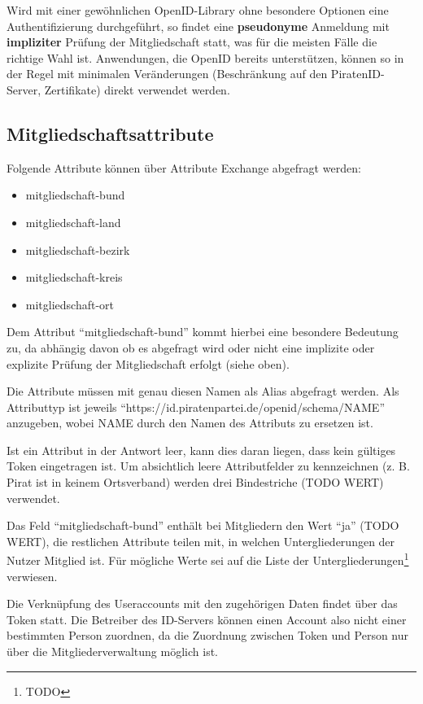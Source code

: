 \documentclass[parskip=half]{scrartcl}
\begin{document}
Wird mit einer gewöhnlichen OpenID-Library ohne besondere Optionen eine Authentifizierung durchgeführt, 
so findet eine \textbf{pseudonyme} Anmeldung mit \textbf{impliziter} Prüfung der Mitgliedschaft statt, was für die meisten Fälle die richtige Wahl ist.
Anwendungen, die OpenID bereits unterstützen, können so in der Regel mit minimalen Veränderungen (Beschränkung auf den PiratenID-Server, Zertifikate) direkt verwendet werden.

\subsection{Mitgliedschaftsattribute}
Folgende Attribute können über Attribute Exchange abgefragt werden:
\label{sec:attribute}
\begin{itemize}
\item mitgliedschaft-bund
\item mitgliedschaft-land
\item mitgliedschaft-bezirk
\item mitgliedschaft-kreis
\item mitgliedschaft-ort
\end{itemize}

Dem Attribut "`mitgliedschaft-bund"' kommt hierbei eine besondere Bedeutung zu,
da abhängig davon ob es abgefragt wird oder nicht eine implizite oder explizite Prüfung der Mitgliedschaft erfolgt (siehe oben).

Die Attribute müssen mit genau diesen Namen als Alias abgefragt werden.
Als Attributtyp ist jeweils "`https://id.piratenpartei.de/openid/schema/NAME"' anzugeben, wobei NAME durch den Namen des Attributs zu ersetzen ist.

Ist ein Attribut in der Antwort leer, kann dies daran liegen, dass kein gültiges Token eingetragen ist.
Um absichtlich leere Attributfelder zu kennzeichnen (z. B. Pirat ist in keinem Ortsverband) werden drei Bindestriche (TODO WERT) verwendet.

Das Feld "`mitgliedschaft-bund"' enthält bei Mitgliedern den Wert "`ja"' (TODO WERT),
die restlichen Attribute teilen mit, in welchen Untergliederungen der Nutzer Mitglied ist.
Für mögliche Werte sei auf die Liste der Untergliederungen\footnote{TODO} verwiesen.

Die Verknüpfung des Useraccounts mit den zugehörigen Daten findet über das Token statt.
Die Betreiber des ID-Servers können einen Account also nicht einer bestimmten Person zuordnen,
da die Zuordnung zwischen Token und Person nur über die Mitgliederverwaltung möglich ist.
\end{document}
